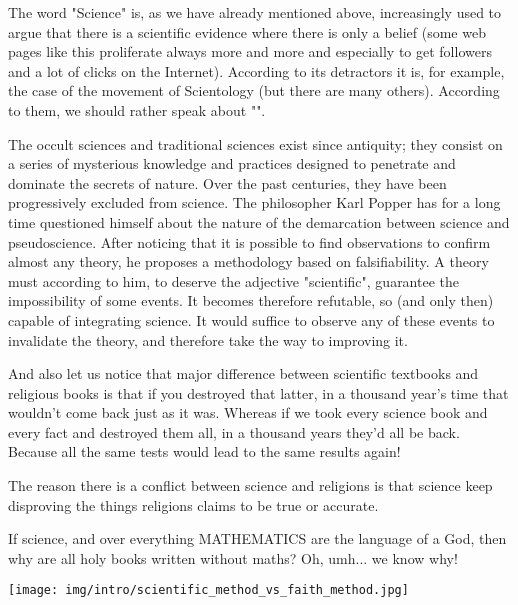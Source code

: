 	The word "Science" is, as we have already mentioned above, increasingly used to argue that there is a scientific evidence where there is only a belief (some web pages like this proliferate always more and more and especially to get followers and a lot of clicks on the Internet). According to its detractors it is, for example, the case of the movement of Scientology (but there are many others). According to them, we should rather speak about "".

	The occult sciences and traditional sciences exist since antiquity; they consist on a series of mysterious knowledge and practices designed to penetrate and dominate the secrets of nature. Over the past centuries, they have been progressively excluded from science. The philosopher Karl Popper has for a long time questioned himself about the nature of the demarcation between science and pseudoscience. After noticing that it is possible to find observations to confirm almost any theory, he proposes a methodology based on falsifiability. A theory must according to him, to deserve the adjective "scientific", guarantee the impossibility of some events. It becomes therefore refutable, so (and only then) capable of integrating science. It would suffice to observe any of these events to invalidate the theory, and therefore take the way to improving it.
	
	And also let us notice that major difference between scientific textbooks and religious books is that if you destroyed that latter, in a thousand year's time that wouldn't come back just as it was. Whereas if we took every science book and every fact and destroyed them all, in a thousand years they'd all be back. Because all the same tests would lead to the same results again!
	\begin{fquote}The reason there is a conflict between science and religions is that science keep disproving the things religions claims to be true or accurate.
 	\end{fquote}
	\begin{tcolorbox}[title=Remark,colframe=black,arc=10pt]
	If science, and over everything MATHEMATICS are the language of a God, then why are all holy books written without maths? Oh, umh... we know why!
	\end{tcolorbox}
	
	\begin{center}
		\texttt{[image: img/intro/scientific\_method\_vs\_faith\_method.jpg]}
	\end{center}
	

